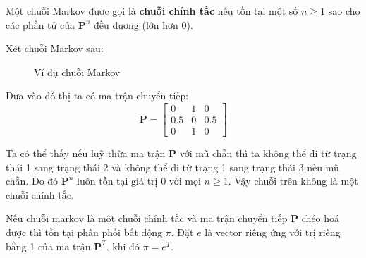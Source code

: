 \begin{defivn}
    Một chuỗi Markov được gọi là \textbf{chuỗi chính tắc} nếu tồn tại một số $n \geq 1$ sao cho các phần tử của $\mathbf{P}^n$ đều dương (lớn hơn 0).
\end{defivn}
\vspace{10pt}

\begin{egvn}Xét chuỗi Markov sau:
\begin{figure}[H]
\centering
{}
\caption{Ví dụ chuỗi Markov} 
\label{fig:grapheg}
\end{figure}

\noindent Dựa vào đồ thị ta có ma trận chuyển tiếp:
$$
\mathbf{P} = \begin{bmatrix}
    0 & 1 & 0 \\
    0.5 & 0 & 0.5 \\
    0 & 1 & 0
\end{bmatrix}
$$

\noindent Ta có thể thấy nếu luỹ thừa ma trận $\mathbf{P}$ với mũ chẵn thì ta không thể đi từ trạng thái 1 sang trạng thái 2 và không thể đi từ trạng 1 sang trạng thái 3 nếu mũ chẵn. Do đó $\mathbf{P}^n$ luôn tồn tại giá trị $0$ với mọi $n \geq 1$. Vậy chuỗi trên không là một chuỗi chính tắc.
\end{egvn}

\begin{theovn}
    Nếu chuỗi markov là một chuỗi chính tắc và ma trận chuyển tiếp $\mathbf{P}$ chéo hoá được thì tồn tại phân phối bất động $\pi$. Đặt $e$ là vector riêng ứng với trị riêng bằng 1 của ma trận $\mathbf{P}^T$, khi đó $\pi = e^T$.
\end{theovn}

